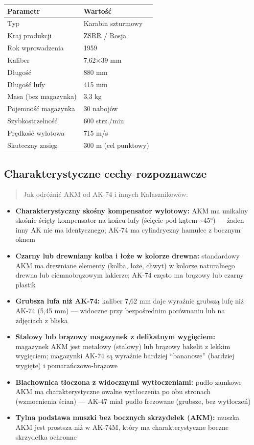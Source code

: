 \documentclass[12pt,oneside]{book}
\providecommand{\tightlist}{%
  \setlength{\itemsep}{0pt}\setlength{\parskip}{0pt}}
\begin{document}
\begin{longtable}[]{@{}ll@{}}
\toprule\noalign{}
Parametr & Wartość \\
\midrule\noalign{}
\endhead
\bottomrule\noalign{}
\endlastfoot
Typ & Karabin szturmowy \\
Kraj produkcji & ZSRR / Rosja \\
Rok wprowadzenia & 1959 \\
Kaliber & 7,62×39 mm \\
Długość & 880 mm \\
Długość lufy & 415 mm \\
Masa (bez magazynka) & 3,3 kg \\
Pojemność magazynka & 30 nabojów \\
Szybkostrzelność & 600 strz./min \\
Prędkość wylotowa & 715 m/s \\
Skuteczny zasięg & 300 m (cel punktowy) \\
\end{longtable}

\subsection{Charakterystyczne cechy
rozpoznawcze}\label{charakterystyczne-cechy-rozpoznawcze-61}

\begin{quote}
Jak odróżnić AKM od AK-74 i innych Kałasznikowów:
\end{quote}

\begin{itemize}
\tightlist
\item
  \textbf{Charakterystyczny skośny kompensator wylotowy:} AKM ma
  unikalny skośnie ścięty kompensator na końcu lufy (ścięcie pod kątem
  \textasciitilde45°) --- żaden inny AK nie ma identycznego; AK-74 ma
  cylindryczny hamulec z bocznym oknem
\item
  \textbf{Czarny lub drewniany kolba i łoże w kolorze drewna:}
  standardowy AKM ma drewniane elementy (kolba, łoże, chwyt) w kolorze
  naturalnego drewna lub ciemnobrązowym lakierze; AK-74 często ma
  brązowy lub czarny plastik
\item
  \textbf{Grubsza lufa niż AK-74:} kaliber 7,62 mm daje wyraźnie grubszą
  lufę niż AK-74 (5,45 mm) --- widoczne przy bezpośrednim porównaniu lub
  na zdjęciach z bliska
\item
  \textbf{Stalowy lub brązowy magazynek z delikatnym wygięciem:}
  magazynek AKM jest metalowy (stalowy) lub brązowy bakelit z lekkim
  wygięciem; magazynki AK-74 są wyraźnie bardziej ``bananowe'' (bardziej
  wygięte) i pomarańczowo-brązowe
\item
  \textbf{Blachownica tłoczona z widocznymi wytłoczeniami:} pudło
  zamkowe AKM ma charakterystyczne owalne wytłoczenia po obu stronach
  (wzmocnienia ścian) --- AK-47 miał pudło frezowane (grubsze, bez
  wytłoczeń)
\item
  \textbf{Tylna podstawa muszki bez bocznych skrzydełek (AKM):} muszka
  AKM jest prostsza niż w AK-74M, który ma charakterystyczne boczne
  skrzydełka ochronne
\end{itemize}
\end{document}
